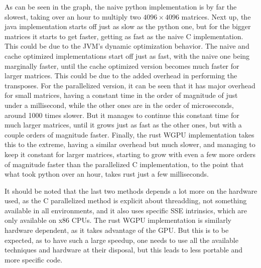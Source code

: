 \documentclass{article}
\begin{document}
As can be seen in the graph, the naive python implementation is by far the slowest,
taking over an hour to multiply two $4096\times 4096$ matrices.
Next up, the java implementation starts off just as slow as the python one,
but for the bigger matrices it starts to get faster, getting as fast
as the naive C implementation. This could be due to the JVM's dynamic optimization behavior.
The naive and cache optimized implementations start off just as fast, with the naive
one being marginally faster, until the cache optimized version becomes much faster
for larger matrices.
This could be due to the added overhead in performing the transposes.
For the parallelized version, it can be seen that it has
major overhead for small matrices, having a constant time in the order of magnitude of just under a millisecond,
while the other ones are in the order of microseconds, around 1000 times slower.
But it manages to continue this constant time for much larger matrices, until it grows
just as fast as the other ones, but with a couple orders of magnitude faster.
Finally, the rust WGPU implementation takes this to the extreme, having a similar
overhead but much slower, and managing to keep it constant for larger matrices,
starting to grow with even a few more orders of magnitude faster than the parallelized C implementation,
to the point that what took python over an hour, takes rust just a few milliseconds.

It should be noted that the last two methods depends a lot more on
the hardware used, as the C parallelized method is explicit about
threadding, not something available in all environments, and it also uses
specific SSE intrinsics, which are only available on x86 CPUs.
The rust WGPU implementation is similarly hardware dependent,
as it takes advantage of the GPU.
But this is to be expected, as to have such a large speedup,
one needs to use all the available techniques and hardware at their disposal,
but this leads to less portable and more specific code.
\end{document}

